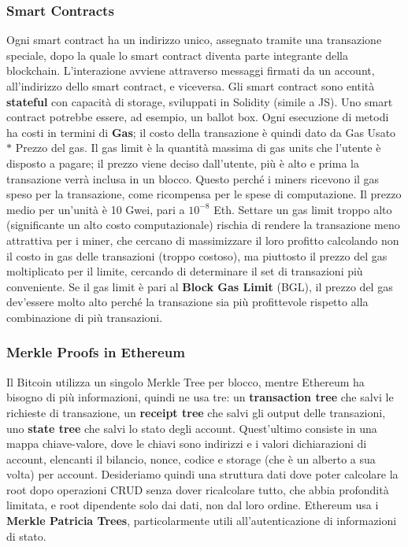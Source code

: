 \documentclass[11pt]{article}
\begin{document}
\subsubsection{Smart Contracts} Ogni smart contract ha un indirizzo unico, assegnato tramite una transazione speciale, dopo la quale lo smart contract diventa parte integrante della blockchain. L'interazione avviene attraverso messaggi firmati da un account, all'indirizzo dello smart contract, e viceversa. Gli smart contract sono entità \textbf{stateful} con capacità di storage, sviluppati in Solidity (simile a JS). Uno smart contract potrebbe essere, ad esempio, un ballot box. Ogni esecuzione di metodi ha costi in termini di \textbf{Gas}; il costo della transazione è quindi dato da Gas Usato $*$ Prezzo del gas. Il gas limit è la quantità massima di gas units che l'utente è disposto a pagare; il prezzo viene deciso dall'utente, più è alto e prima la transazione verrà inclusa in un blocco. Questo perché i miners ricevono il gas speso per la transazione, come ricompensa per le spese di computazione. Il prezzo medio per un'unità è 10 Gwei, pari a $10^{-8}$ Eth. Settare un gas limit troppo alto (significante un alto costo computazionale) rischia di rendere la transazione meno attrattiva per i miner, che cercano di massimizzare il loro profitto calcolando non il costo in gas delle transazioni (troppo costoso), ma piuttosto il prezzo del gas moltiplicato per il limite, cercando di determinare il set di transazioni più conveniente. Se il gas limit è pari al \textbf{Block Gas Limit} (BGL), il prezzo del gas dev'essere molto alto perché la transazione sia più profittevole rispetto alla combinazione di più transazioni. 
\subsubsection{Merkle Proofs in Ethereum} Il Bitcoin utilizza un singolo Merkle Tree per blocco, mentre Ethereum ha bisogno di più informazioni, quindi ne usa tre: un \textbf{transaction tree} che salvi le richieste di transazione, un \textbf{receipt tree} che salvi gli output delle transazioni, uno \textbf{state tree} che salvi lo stato degli account. Quest'ultimo consiste in una mappa chiave-valore, dove le chiavi sono indirizzi e i valori dichiarazioni di account, elencanti il bilancio, nonce, codice e storage (che è un alberto a sua volta) per account. Desideriamo quindi una struttura dati dove poter calcolare la root dopo operazioni CRUD senza dover ricalcolare tutto, che abbia profondità limitata, e root dipendente solo dai dati, non dal loro ordine. Ethereum usa i \textbf{Merkle Patricia Trees}, particolarmente utili all'autenticazione di informazioni di stato. 
\end{document}
